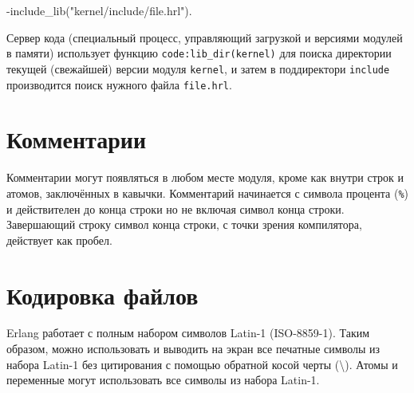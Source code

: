 \begin{erlang}
-include_lib("kernel/include/file.hrl").
\end{erlang}

Сервер кода (специальный процесс, управляющий загрузкой и версиями модулей в памяти) 
использует функцию \texttt{code:lib\_dir(kernel)} для поиска директории текущей
(свежайшей) версии модуля \texttt{kernel}, и затем в поддиректори \texttt{include} 
производится поиск нужного файла \texttt{file.hrl}.



\section{Комментарии}

Комментарии могут появляться в любом месте модуля, кроме как внутри строк и атомов,
заключённых в кавычки. Комментарий начинается с символа процента (\texttt{\%}) и
действителен до конца строки но не включая символ конца строки. Завершающий строку
символ конца строки, с точки зрения компилятора, действует как пробел.



\section{Кодировка файлов}

Erlang работает с полным набором символов Latin-1 (ISO-8859-1). Таким образом, 
можно использовать и выводить на экран все печатные символы из набора Latin-1 без
цитирования с помощью обратной косой черты (\textbackslash{}). Атомы и переменные 
могут использовать все символы из набора Latin-1.

